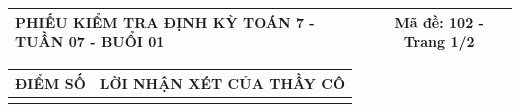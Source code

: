 \documentclass[12pt,a4paper]{article}
\begin{document}
\newpage


\noindent
\begin{tabularx}{\linewidth}{|X|c|}
\hline
\textbf{PHIẾU KIỂM TRA ĐỊNH KỲ TOÁN 7 - TUẦN 07 - BUỔI 01} & \textbf{Mã đề: 102 - Trang 1/2} \\
\hline
\end{tabularx}

\vspace{1.2mm}

\noindent
\begin{tabularx}{\linewidth}{|p{3.2cm}|X|}
\hline
\centering\textbf{ĐIỂM SỐ} & \centering\textbf{LỜI NHẬN XÉT CỦA THẦY CÔ} \tabularnewline
\hline
\rule{0pt}{1.8cm} & \tabularnewline
\hline
\end{tabularx}

\vspace{1.5mm}
\end{document}
